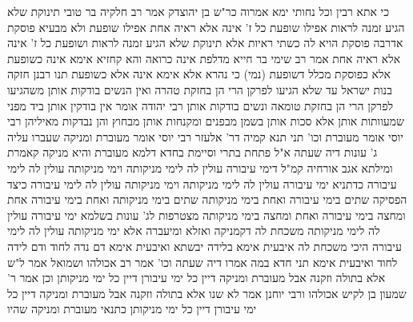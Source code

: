 \documentclass[12pt, openany]{book}
\begin{document}
{כי אתא רבין וכל נחותי ימא אמרוה כר"ש בן יהוצדק 
אמר רב חלקיה בר טובי תינוקת שלא הגיע זמנה לראות אפילו שופעת כל ז' אינה אלא ראיה אחת אפילו שופעת ולא מבעיא פוסקת אדרבה פוסקת הויא לה כשתי ראיות 
אלא תינוקת שלא הגיע זמנה לראות ושופעת כל ז' אינה אלא ראיה אחת 
אמר רב שימי בר חייא מדלפת אינה כרואה והא קחזיא אימא אינה כשופעת אלא כפוסקת 
מכלל דשופעת (נמי) כי נהרא אלא אימא אינה אלא כשופעת 
תנו רבנן חזקה בנות ישראל עד שלא הגיעו לפרקן הרי הן בחזקת טהרה ואין הנשים בודקות אותן משהגיעו לפרקן הרי הן בחזקת טומאה ונשים בודקות אותן 
רבי יהודה אומר אין בודקין אותן ביד מפני שמעוותות אותן אלא סכות אותן בשמן מבפנים ומקנחות אותן מבחוץ והן נבדקות מאיליהן
רבי יוסי אומר מעוברת וכו' תני תנא קמיה דר' אלעזר רבי יוסי אומר מעוברת ומניקה שעברו עליה ג' עונות דיה שעתה א"ל פתחת בתרי וסיימת בחדא 
דלמא מעוברת והיא מניקה קאמרת ומילתא אגב אורחיה קמ"ל דימי עיבורה עולין לה לימי מניקותה וימי מניקותה עולין לה לימי עיבורה כדתניא ימי עיבורה עולין לה לימי מניקותה וימי מניקותה עולין לה לימי עיבורה 
כיצד הפסיקה שתים בימי עיבורה ואחת בימי מניקותה שתים בימי מניקותה ואחת בימי עיבורה אחת ומחצה בימי עיבורה ואחת ומחצה בימי מניקותה מצטרפות לג' עונות 
בשלמא ימי עיבורה עולין לה לימי מניקותה משכחת לה דקמניקה ואזלא ומיעברה אלא ימי מניקותה עולין לה לימי עיבורה היכי משכחת לה 
איבעית אימא בלידה יבשתא ואיבעית אימא דם נדה לחוד ודם לידה לחוד ואיבעית אימא תני חדא
במה אמרו דיה שעתה וכו' אמר רב אכולהו
ושמואל אמר ל"ש אלא בתולה וזקנה אבל מעוברת ומניקה דיין כל ימי עיבורן דיין כל ימי מניקותן 
וכן אמר ר' שמעון בן לקיש אכולהו ורבי יוחנן אמר לא שנו אלא בתולה וזקנה אבל מעוברת ומניקה דיין כל ימי עיבורן דיין כל ימי מניקותן כתנאי מעוברת ומניקה שהיו}
\end{document}
